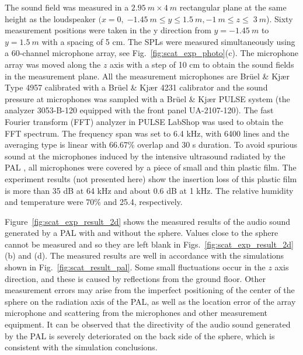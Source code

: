 The sound field was measured in a $\SI{2.95}{m} \times\SI{4}{m}$ rectangular plane at the same height as the loudspeaker $(x = 0,\SI{-1.45}{m} \leq  y \leq \SI{1.5}{m}, \SI{-1}{ m}\leq  z \leq\SI{ 3 }{m}$). 
Sixty measurement positions were taken in the y direction from $y = \SI{-1.45}{ m}$ to $y = \SI{1.5 }{m}$ with a spacing of 5 cm. The SPLs were measured simultaneously using a 60-channel microphone array, see Fig.~\ref{fig:scat_exp_photo}(c). 
The microphone array was moved along the $z$ axis with a step of 10 cm to obtain the sound fields in the measurement plane. 
All the measurement microphones are Brüel \& Kjær Type 4957 calibrated with a Brüel \& Kjær 4231 calibrator and the sound pressure at microphones was sampled with a Brüel \& Kjær PULSE system (the analyzer 3053-B-120 equipped with the front panel UA-2107-120). The fast Fourier transform (FFT) analyzer in PULSE LabShop was used to obtain the FFT spectrum. The frequency span was set to 6.4 kHz, with 6400 lines and the averaging type is linear with 66.67\% overlap and 30 s duration. To avoid spurious sound at the microphones induced by the intensive ultrasound radiated by the PAL \cite{Ji2019ExperimentalInvestigationParameters}, all microphones were covered by a piece of small and thin plastic film. The experiment results (not presented here) show the insertion loss of this plastic film is more than 35 dB at 64 kHz and about 0.6 dB at 1 kHz. The relative humidity and temperature were 70\% and 25.4\celsius, respectively.

Figure~\ref{fig:scat_exp_result_2d} shows the measured results of the audio sound generated by a PAL with and without the sphere. 
Values close to the sphere cannot be measured and so they are left blank in Figs.~\ref{fig:scat_exp_result_2d}(b) and (d). 
The measured results are well in accordance with the simulations shown in Fig.~\ref{fig:scat_result_pal}. 
Some small fluctuations occur in the $z$ axis direction, and these is caused by reflections from the ground floor. 
Other measurement errors may arise from the imperfect positioning of the center of the sphere on the radiation axis of the PAL, as well as the location error of the array microphone and scattering from the microphones and other measurement equipment. 
It can be observed that the directivity of the audio sound generated by the PAL is severely deteriorated on the back side of the sphere, which is consistent with the simulation conclusions.

